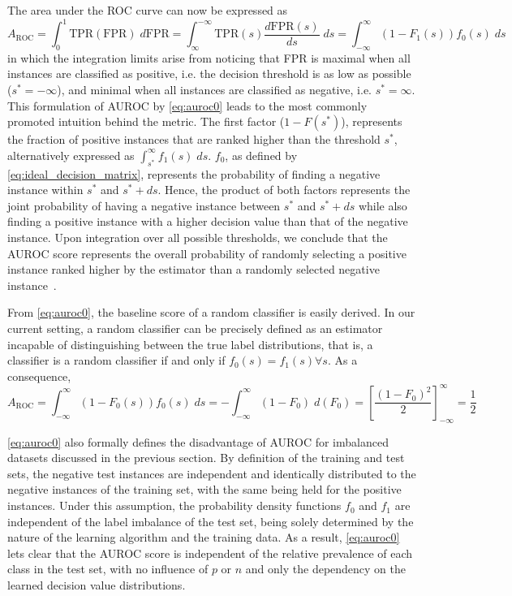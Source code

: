 The area under the ROC curve can now be expressed as
%
\begin{equation}
    A_\text{ROC}
    = \int_{0}^{1} \text{TPR}(\text{FPR}) \;d\text{FPR}
    = \int_{\infty}^{-\infty} \text{TPR}(s) \frac{d\text{FPR}(s)}{ds} \;ds
    = \int_{-\infty}^{\infty} (1 - F_1(s)) f_0(s) \;ds
    \label{auroc0}
\end{equation}
%
in which the integration limits arise from noticing that FPR is maximal when all instances are classified as positive, i.e. the decision threshold is as low as possible ($s^* = -\infty$), and minimal when all instances are classified as negative, i.e. $s^* = \infty$. This formulation of AUROC by \autoref{eq:auroc0} leads to the most commonly promoted intuition behind the metric.
%
The first factor ($1- F(s^*)$), represents the fraction of positive instances that are ranked higher than the threshold $s^*$, alternatively expressed as $\int_{s^*}^{\infty}f_1(s)\; ds$. $f_0$, as defined by \autoref{eq:ideal_decision_matrix}, represents the probability of finding a negative instance within $s^*$ and $s^* + ds$. Hence, the product of both factors represents the joint probability of having a negative instance between $s^*$ and $s^* + ds$ while also finding a positive instance with a higher decision value than that of the negative instance. 
%
Upon integration over all possible thresholds, we conclude that the AUROC score represents the overall probability of randomly selecting a positive instance ranked higher by the estimator than a randomly selected negative instance~\cite{}.

From \autoref{eq:auroc0}, the baseline score of a random classifier is easily derived. In our current setting, a random classifier can be precisely defined as an estimator incapable of distinguishing between the true label distributions, that is, a classifier is a random classifier if and only if $f_0(s) = f_1(s) \forall s$. As a consequence,
%
\begin{equation}
    A_\text{ROC}
    = \int_{-\infty}^{\infty} (1 - F_0(s)) f_0(s) \;ds
    = -\int_{-\infty}^{\infty} (1 - F_0) \;d(F_0)
    = \left[\frac{(1-F_0)^2}{2}\right]_{-\infty}^{\infty}
    = \frac{1}{2}
    \label{auroc_random}
\end{equation}
 
\autoref{eq:auroc0} also formally defines the disadvantage of AUROC for imbalanced datasets discussed in the previous section.
%
By definition of the training and test sets, the negative test instances are independent and identically distributed to the negative instances of the training set, with the same being held for the positive instances. Under this assumption, the probability density functions $f_0$ and $f_1$ are independent of the label imbalance of the test set, being solely determined by the nature of the learning algorithm and the training data. As a result, \autoref{eq:auroc0} lets clear that the AUROC score is independent of the relative prevalence of each class in the test set, with no influence of $p$ or $n$ and only the dependency on the learned decision value distributions.

